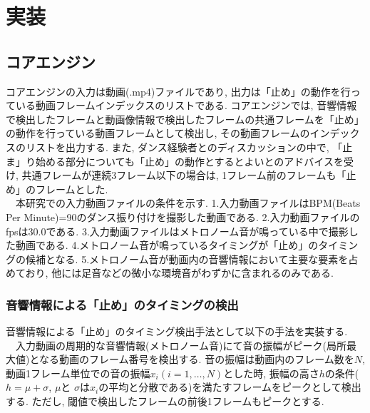 \documentclass[technicalreport]{ieicej}
\begin{document}
\section{実装}
\subsection{コアエンジン}
コアエンジンの入力は動画(.mp4)ファイルであり, 出力は「止め」の動作を行っている動画フレームインデックスのリストである. コアエンジンでは, 音響情報で検出したフレームと動画像情報で検出したフレームの共通フレームを「止め」の動作を行っている動画フレームとして検出し, その動画フレームのインデックスのリストを出力する. また, ダンス経験者とのディスカッションの中で, 「止ま」り始める部分についても「止め」の動作とするとよいとのアドバイスを受け, 共通フレームが連続3フレーム以下の場合は, 1フレーム前のフレームも「止め」のフレームとした. \\
　本研究での入力動画ファイルの条件を示す. 1.入力動画ファイルはBPM(Beats Per Minute)=90のダンス振り付けを撮影した動画である. 2.入力動画ファイルのfpsは30.0である. 3.入力動画ファイルはメトロノーム音が鳴っている中で撮影した動画である. 4.メトロノーム音が鳴っているタイミングが「止め」のタイミングの候補となる. 5.メトロノーム音が動画内の音響情報において主要な要素を占めており, 他には足音などの微小な環境音がわずかに含まれるのみである. 
\subsubsection{音響情報による「止め」のタイミングの検出}
音響情報による「止め」のタイミング検出手法として以下の手法を実装する. \\
　入力動画の周期的な音響情報(メトロノーム音)にて音の振幅がピーク(局所最大値)となる動画のフレーム番号を検出する. 音の振幅は動画内のフレーム数を$N$, 動画1フレーム単位での音の振幅$x_i(i=1,\dots,N)$とした時, 振幅の高さ$h$の条件($h=\mu+\sigma$, $\mu$と $\sigma$は$x_i$の平均と分散である)を満たすフレームをピークとして検出する. ただし, 閾値で検出したフレームの前後1フレームもピークとする. 
\end{document}
